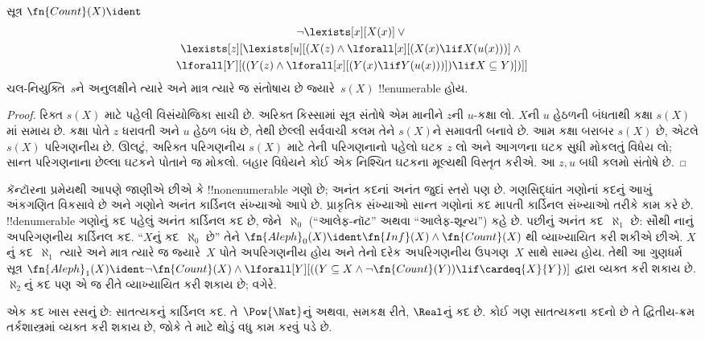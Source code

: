 \documentclass[../../../include/open-logic-section]{subfiles}
\begin{document}
\begin{prop}
સૂત્ર $\fn{Count}(X) \ident $
\begin{multline*}
\lnot \lexists[x][X(x)] \lor {} \\
\lexists[z][\lexists[u][(X(z) \land
    \lforall[x][(X(x) \lif X(u(x)))] \land {} \\ \lforall[Y][((Y(z) \land
      \lforall[x][(Y(x) \lif Y(u(x)))]) \lif X \subseteq Y)])]]
\end{multline*}
ચલ-નિયુક્તિ~$s$ને અનુલક્ષીને ત્યારે અને માત્ર ત્યારે જ સંતોષાય છે
જ્યારે~$s(X)$ !!{enumerable} હોય.
\end{prop}
\begin{proof}
રિક્ત $s(X)$ માટે પહેલી વિસંયોજિકા સાચી છે. અરિક્ત કિસ્સામાં
સૂત્ર સંતોષે એમ માનીને $z$ની $u$-કક્ષા લો. $X$ની $u$ હેઠળની
બંધતાથી કક્ષા $s(X)$માં સમાય છે. કક્ષા પોતે $z$ ધરાવતી અને
$u$ હેઠળ બંધ છે, તેથી છેલ્લી સર્વવાચી કલમ તેને $s(X)$ને સમાવતી
બનાવે છે. આમ કક્ષા બરાબર $s(X)$ છે, એટલે $s(X)$ પરિગણનીય છે.
ઊલટું, અરિક્ત પરિગણનીય $s(X)$ માટે તેની પરિગણનાનો પહેલો ઘટક
$z$ લો અને આગળના ઘટક સુધી મોકલતું વિધેય લો; સાન્ત પરિગણનાના
છેલ્લા ઘટકને પોતાને જ મોકલો. બહાર વિધેયને કોઈ એક નિશ્ચિત
ઘટકના મૂલ્યથી વિસ્તૃત કરીએ. આ $z,u$ બધી કલમો સંતોષે છે.
\end{proof}

કૅન્ટૉરના પ્રમેયથી આપણે જાણીએ છીએ કે !!{nonenumerable} ગણો છે;
અનંત કદનાં અનંત જુદાં સ્તરો પણ છે. ગણસિદ્ધાંત ગણોનાં કદનું આખું
અંકગણિત વિકસાવે છે અને ગણોને અનંત કાર્ડિનલ સંખ્યાઓ આપે છે. પ્રાકૃતિક
સંખ્યાઓ સાન્ત ગણોનાં કદ માપતી કાર્ડિનલ સંખ્યાઓ તરીકે કામ કરે છે.
!!{denumerable} ગણોનું કદ પહેલું અનંત કાર્ડિનલ કદ છે, જેને~$\aleph_0$
(``આલેફ-નૉટ'' અથવા ``આલેફ-શૂન્ય'') કહે છે. પછીનું અનંત કદ~$\aleph_1$
છે: સૌથી નાનું અપરિગણનીય કાર્ડિનલ કદ. ``$X$નું કદ~$\aleph_0$ છે''
તેને $\fn{Aleph}_0(X) \ident \fn{Inf}(X) \land \fn{Count}(X)$
થી વ્યાખ્યાયિત કરી શકીએ છીએ. $X$નું કદ~$\aleph_1$ ત્યારે અને માત્ર
ત્યારે જ જ્યારે~$X$ પોતે અપરિગણનીય હોય અને તેનો દરેક અપરિગણનીય
ઉપગણ~$X$ સાથે સામ્ય હોય. તેથી આ ગુણધર્મ સૂત્ર
$\fn{Aleph}_1(X) \ident \lnot\fn{Count}(X) \land
\lforall[Y][((Y \subseteq X \land \lnot\fn{Count}(Y))
  \lif \cardeq{X}{Y})]$ દ્વારા વ્યક્ત કરી શકાય છે. $\aleph_2$નું
કદ પણ એ જ રીતે વ્યાખ્યાયિત કરી શકાય છે; વગેરે.

એક કદ ખાસ રસનું છે: સાતત્યકનું કાર્ડિનલ કદ. તે~$\Pow{\Nat}$નું
અથવા, સમકક્ષ રીતે, $\Real$નું કદ છે. કોઈ ગણ સાતત્યકના કદનો છે
તે દ્વિતીય-ક્રમ તર્કશાસ્ત્રમાં વ્યક્ત કરી શકાય છે, જોકે તે માટે
થોડું વધુ કામ કરવું પડે છે.
\end{document}
